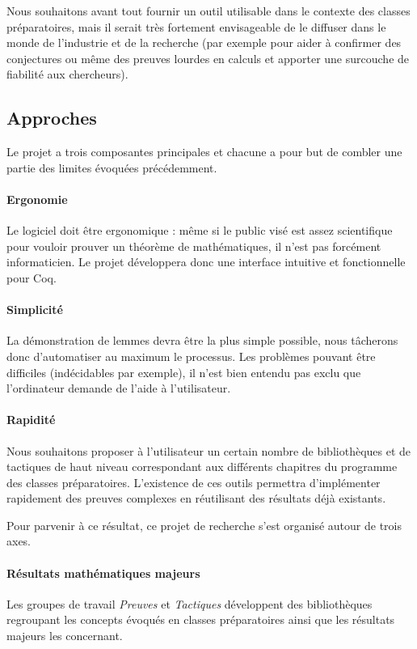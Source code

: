 Nous souhaitons avant tout fournir un outil utilisable dans le contexte des classes préparatoires, mais il serait très fortement envisageable de le diffuser dans le monde de l'industrie et de la recherche (par exemple pour aider à confirmer des conjectures ou même des preuves lourdes en calculs et apporter une surcouche de fiabilité aux chercheurs).

\subsection{Approches}

Le projet \coquille{} a trois composantes principales et chacune a pour but de combler une partie des limites évoquées précédemment.

\paragraph{Ergonomie} Le logiciel doit être ergonomique : même si le public visé est assez scientifique pour vouloir prouver un théorème de mathématiques, il n'est pas forcément informaticien. Le projet \coquille{} développera donc une interface intuitive et fonctionnelle pour Coq.

\paragraph{Simplicité} La démonstration de lemmes devra être la plus simple possible, nous tâcherons donc d'automatiser au maximum le processus. Les problèmes pouvant être difficiles (indécidables par exemple), il n'est bien entendu pas exclu que l'ordinateur demande de l'aide à l'utilisateur.

\paragraph{Rapidité} Nous souhaitons proposer à l'utilisateur un certain nombre de bibliothèques et de tactiques de haut niveau correspondant aux différents chapitres du programme des classes préparatoires. L'existence de ces outils permettra d'implémenter rapidement des preuves complexes en réutilisant des résultats déjà existants.

\bigskip

Pour parvenir à ce résultat, ce projet de recherche s'est organisé autour de trois axes.

\paragraph{Résultats mathématiques majeurs} Les groupes de travail \emph{Preuves} et \emph{Tactiques} développent des bibliothèques regroupant les concepts évoqués en classes préparatoires ainsi que les résultats majeurs les concernant.

